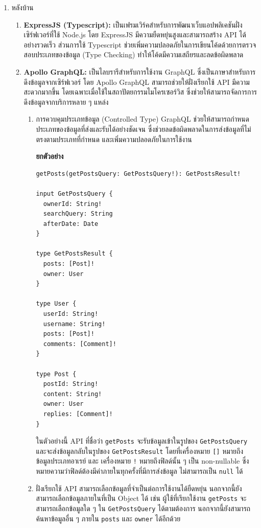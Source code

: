 \begin{enumerate}
    \item หลังบ้าน
    \begin{enumerate}
        \item \textbf{ExpressJS (Typescript):} เป็นเฟรมเวิร์คสำหรับการพัฒนาเว็บแอปพลิเคชันฝั่งเซิร์ฟเวอร์ที่ใช้ Node.js โดย ExpressJS มีความยืดหยุ่นสูงและสามารถสร้าง API ได้อย่างรวดเร็ว ส่วนการใช้ Typescript ช่วยเพิ่มความปลอดภัยในการเขียนโค้ดด้วยการตรวจสอบประเภทของข้อมูล (Type Checking) ทำให้โค้ดมีความเสถียรและลดข้อผิดพลาด
        \item \textbf{Apollo GraphQL:} เป็นไลบรารีสำหรับการใช้งาน GraphQL ซึ่งเป็นภาษาสำหรับการดึงข้อมูลจากเซิร์ฟเวอร์ โดย Apollo GraphQL สามารถช่วยให้ฝั่งเรียกใช้ API มีความสะดวกมากขึ้น โดยเฉพาะเมื่อใช้ในสถาปัตยกรรมไมโครเซอร์วิส ซึ่งช่วยให้สามารถจัดการการดึงข้อมูลจากบริการหลาย ๆ แหล่ง
        \begin{enumerate}
            \item การควบคุมประเภทข้อมูล (Controlled Type) GraphQL ช่วยให้สามารถกำหนดประเภทของข้อมูลที่ส่งและรับได้อย่างชัดเจน ซึ่งช่วยลดข้อผิดพลาดในการส่งข้อมูลที่ไม่ตรงตามประเภทที่กำหนด และเพิ่มความปลอดภัยในการใช้งาน \cite{apollo-types}
            
            \textbf{ยกตัวอย่าง}
            \begin{center}                
                \begin{lstlisting}
getPosts(getPostsQuery: GetPostsQuery!): GetPostsResult!

input GetPostsQuery {
  ownerId: String!
  searchQuery: String
  afterDate: Date
}

type GetPostsResult {
  posts: [Post]!
  owner: User
}

type User {
  userId: String!
  username: String!
  posts: [Post]!
  comments: [Comment]!
}

type Post {
  postId: String!
  content: String!
  owner: User
  replies: [Comment]!
}
                \end{lstlisting}
            \end{center}
            ในตัวอย่างนี้ API ที่ชื่อว่า {\tt getPosts} จะรับข้อมูลเข้าในรูปของ {\tt GetPostsQuery} และจะส่งข้อมูลกลับในรูปของ {\tt GetPostsResult} โดยที่เครื่องหมาย \texttt{[]} หมายถึงข้อมูลประเภทอาเรย์ และ เครื่องหมาย \texttt{!} หมายถึงฟิลด์นั้น ๆ เป็น non-nullable ซึ่งหมายความว่าฟิลด์ต้องมีค่าภายในทุกครั้งที่มีการส่งข้อมูล ไม่สามารถเป็น \texttt{null} ได้

            \item ฝั่งเรียกใช้ API สามารถเลือกข้อมูลที่จำเป็นต่อการใช้งานได้ยืดหยุ่น นอกจากนี้ยังสามารถเลือกข้อมูลภายในที่เป็น Object ได้ เช่น ผู้ใช้ที่เรียกใช้งาน \texttt{getPosts} จะสามารถเลือกข้อมูลใด ๆ ใน \texttt{GetPostsQuery} ได้ตามต้องการ นอกจากนี้ยังสามารถค้นหาข้อมูลอื่น ๆ ภายใน \texttt{posts} และ \texttt{owner} ได้อีกด้วย \cite{apollo-resolver}
            

\end{enumerate}
\end{enumerate}
\end{enumerate}
